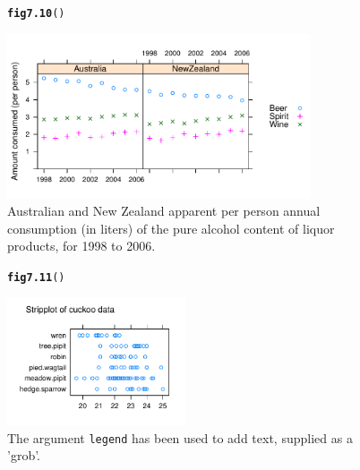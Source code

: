\documentclass[12pt, a4paper,  BCOR=8.25mm, DIV=15]{scrartcl}\usepackage[]{graphicx}\usepackage[]{color}
\makeatletter
\newcommand{\hlstd}[1]{\textcolor[rgb]{0.345,0.345,0.345}{#1}}%
\newcommand{\hlkwd}[1]{\textcolor[rgb]{0.737,0.353,0.396}{\textbf{#1}}}%
\newenvironment{kframe}{%
 \def\at@end@of@kframe{}%
 \ifinner\ifhmode%
  \def\at@end@of@kframe{\end{minipage}}%
  \begin{minipage}{\columnwidth}%
 \fi\fi%
 \def\FrameCommand##1{\hskip\@totalleftmargin \hskip-\fboxsep
 \colorbox{shadecolor}{##1}\hskip-\fboxsep
     \hskip-\linewidth \hskip-\@totalleftmargin \hskip\columnwidth}%
 \MakeFramed {\advance\hsize-\width
   \@totalleftmargin\z@ \linewidth\hsize
   \@setminipage}}%
 {\par\unskip\endMakeFramed%
 \at@end@of@kframe}
\newenvironment{knitrout}{}{} %
\newcommand{\txtt}[1]{{\texttt{#1}}}
\makeatother
\begin{document}
\begin{figure}[ht]
\begin{knitrout}
\color{fgcolor}\begin{kframe}
\begin{alltt}
\hlkwd{fig7.10}\hlstd{()}
\end{alltt}
\end{kframe}

{\centering \includegraphics[width=0.8\textwidth]{figure/gph-fig7_10e-1} 

}



\end{knitrout}
\caption{Australian and New Zealand apparent per person annual
  consumption (in liters) of the pure alcohol content of liquor products, for
  1998 to 2006.\label{fig:allgrog}}
\end{figure}

\begin{figure}[ht]
\begin{knitrout}
\color{fgcolor}\begin{kframe}
\begin{alltt}
\hlkwd{fig7.11}\hlstd{()}
\end{alltt}
\end{kframe}

{\centering \includegraphics[width=0.47\textwidth]{figure/gph-fig7_11e-1} 

}



\end{knitrout}
\caption{The argument \txtt{legend} has been used to add text,
  supplied as a 'grob'.\label{fig:textGrob}}
\end{figure}
\end{document}
